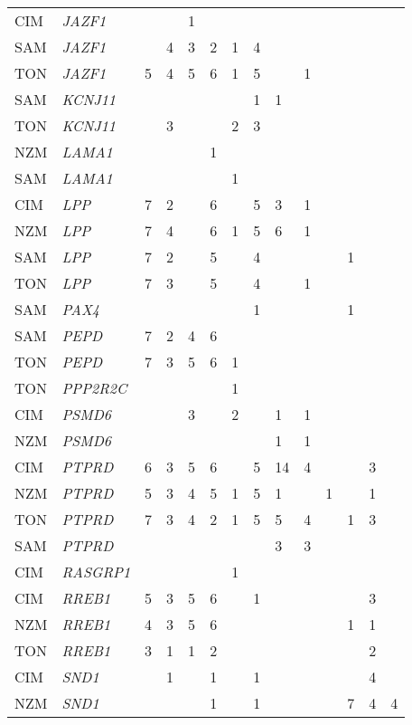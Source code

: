 \documentclass[]{report}
\begin{document}
\begin{ThreePartTable}
\begin{longtable}[t]{llllllllllllll}
CIM & \em{JAZF1} &  &  & 1 &  &  &  &  &  &  &  &  & \\
SAM & \em{JAZF1} &  & 4 & 3 & 2 & 1 & 4 &  &  &  &  &  & \\
TON & \em{JAZF1} & 5 & 4 & 5 & 6 & 1 & 5 &  & 1 &  &  &  & \\
SAM & \em{KCNJ11} &  &  &  &  &  & 1 & 1 &  &  &  &  & \\
TON & \em{KCNJ11} &  & 3 &  &  & 2 & 3 &  &  &  &  &  & \\
NZM & \em{LAMA1} &  &  &  & 1 &  &  &  &  &  &  &  & \\
SAM & \em{LAMA1} &  &  &  &  & 1 &  &  &  &  &  &  & \\
CIM & \em{LPP} & 7 & 2 &  & 6 &  & 5 & 3 & 1 &  &  &  & \\
NZM & \em{LPP} & 7 & 4 &  & 6 & 1 & 5 & 6 & 1 &  &  &  & \\
SAM & \em{LPP} & 7 & 2 &  & 5 &  & 4 &  &  &  & 1 &  & \\
TON & \em{LPP} & 7 & 3 &  & 5 &  & 4 &  & 1 &  &  &  & \\
SAM & \em{PAX4} &  &  &  &  &  & 1 &  &  &  & 1 &  & \\
SAM & \em{PEPD} & 7 & 2 & 4 & 6 &  &  &  &  &  &  &  & \\
TON & \em{PEPD} & 7 & 3 & 5 & 6 & 1 &  &  &  &  &  &  & \\
TON & \em{PPP2R2C} &  &  &  &  & 1 &  &  &  &  &  &  & \\
CIM & \em{PSMD6} &  &  & 3 &  & 2 &  & 1 & 1 &  &  &  & \\
NZM & \em{PSMD6} &  &  &  &  &  &  & 1 & 1 &  &  &  & \\
CIM & \em{PTPRD} & 6 & 3 & 5 & 6 &  & 5 & 14 & 4 &  &  & 3 & \\
NZM & \em{PTPRD} & 5 & 3 & 4 & 5 & 1 & 5 & 1 &  & 1 &  & 1 & \\
TON & \em{PTPRD} & 7 & 3 & 4 & 2 & 1 & 5 & 5 & 4 &  & 1 & 3 & \\
SAM & \em{PTPRD} &  &  &  &  &  &  & 3 & 3 &  &  &  & \\
CIM & \em{RASGRP1} &  &  &  &  & 1 &  &  &  &  &  &  & \\
CIM & \em{RREB1} & 5 & 3 & 5 & 6 &  & 1 &  &  &  &  & 3 & \\
NZM & \em{RREB1} & 4 & 3 & 5 & 6 &  &  &  &  &  & 1 & 1 & \\
TON & \em{RREB1} & 3 & 1 & 1 & 2 &  &  &  &  &  &  & 2 & \\
CIM & \em{SND1} &  & 1 &  & 1 &  & 1 &  &  &  &  & 4 & \\
NZM & \em{SND1} &  &  &  & 1 &  & 1 &  &  &  & 7 & 4 & 4\\

\end{longtable}
\end{ThreePartTable}
\end{document}
